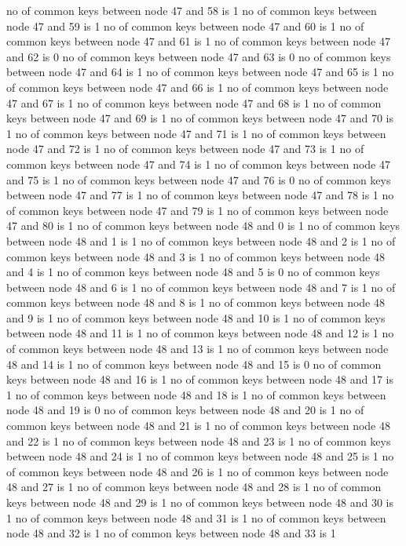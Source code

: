 no of common keys between node 47 and 58 is 1
no of common keys between node 47 and 59 is 1
no of common keys between node 47 and 60 is 1
no of common keys between node 47 and 61 is 1
no of common keys between node 47 and 62 is 0
no of common keys between node 47 and 63 is 0
no of common keys between node 47 and 64 is 1
no of common keys between node 47 and 65 is 1
no of common keys between node 47 and 66 is 1
no of common keys between node 47 and 67 is 1
no of common keys between node 47 and 68 is 1
no of common keys between node 47 and 69 is 1
no of common keys between node 47 and 70 is 1
no of common keys between node 47 and 71 is 1
no of common keys between node 47 and 72 is 1
no of common keys between node 47 and 73 is 1
no of common keys between node 47 and 74 is 1
no of common keys between node 47 and 75 is 1
no of common keys between node 47 and 76 is 0
no of common keys between node 47 and 77 is 1
no of common keys between node 47 and 78 is 1
no of common keys between node 47 and 79 is 1
no of common keys between node 47 and 80 is 1
no of common keys between node 48 and 0 is 1
no of common keys between node 48 and 1 is 1
no of common keys between node 48 and 2 is 1
no of common keys between node 48 and 3 is 1
no of common keys between node 48 and 4 is 1
no of common keys between node 48 and 5 is 0
no of common keys between node 48 and 6 is 1
no of common keys between node 48 and 7 is 1
no of common keys between node 48 and 8 is 1
no of common keys between node 48 and 9 is 1
no of common keys between node 48 and 10 is 1
no of common keys between node 48 and 11 is 1
no of common keys between node 48 and 12 is 1
no of common keys between node 48 and 13 is 1
no of common keys between node 48 and 14 is 1
no of common keys between node 48 and 15 is 0
no of common keys between node 48 and 16 is 1
no of common keys between node 48 and 17 is 1
no of common keys between node 48 and 18 is 1
no of common keys between node 48 and 19 is 0
no of common keys between node 48 and 20 is 1
no of common keys between node 48 and 21 is 1
no of common keys between node 48 and 22 is 1
no of common keys between node 48 and 23 is 1
no of common keys between node 48 and 24 is 1
no of common keys between node 48 and 25 is 1
no of common keys between node 48 and 26 is 1
no of common keys between node 48 and 27 is 1
no of common keys between node 48 and 28 is 1
no of common keys between node 48 and 29 is 1
no of common keys between node 48 and 30 is 1
no of common keys between node 48 and 31 is 1
no of common keys between node 48 and 32 is 1
no of common keys between node 48 and 33 is 1

